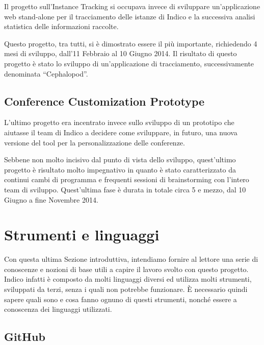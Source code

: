         	Il progetto sull'Instance Tracking si occupava invece di sviluppare un'applicazione web stand-alone per il tracciamento delle istanze di Indico e la successiva analisi statistica delle informazioni raccolte.
        	
        	Questo progetto, tra tutti, si è dimostrato essere il più importante, richiedendo 4 mesi di sviluppo, dall'11 Febbraio al 10 Giugno 2014. Il risultato di questo progetto è stato lo sviluppo di un'applicazione di tracciamento, successivamente denominata ``Cephalopod''.
    	
    	\subsection{Conference Customization Prototype} \label{subsec:p;pp;conference_customization_prototype}
    	
        	L'ultimo progetto era incentrato invece sullo sviluppo di un prototipo che aiutasse il team di Indico a decidere come sviluppare, in futuro, una nuova versione del tool per la personalizzazione delle conferenze.
        	
        	Sebbene non molto incisivo dal punto di vista dello sviluppo, quest'ultimo progetto è risultato molto impegnativo in quanto è stato caratterizzato da continui cambi di programma e frequenti sessioni di brainstorming con l'intero team di sviluppo. Quest'ultima fase è durata in totale circa 5 e mezzo, dal 10 Giugno a fine Novembre 2014.
    	
    \section{Strumenti e linguaggi} \label{sec:p;strumenti_linguaggi}
    
        Con questa ultima Sezione introduttiva, intendiamo fornire al lettore una serie di conoscenze e nozioni di base utili a capire il lavoro svolto con questo progetto. Indico infatti è composto da molti linguaggi diversi ed utilizza molti strumenti, sviluppati da terzi, senza i quali non potrebbe funzionare. È necessario quindi sapere quali sono e cosa fanno ognuno di questi strumenti, nonché essere a conoscenza dei linguaggi utilizzati.
        
        \subsection{GitHub} \label{subsec:p;sl;github}
        
